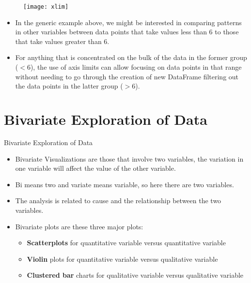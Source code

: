 \documentclass[12pt]{beamer}
\begin{document}
    \begin{frame}{}
    	\begin{figure}
    		\centering
    		\texttt{[image: xlim]}
    	\end{figure}
    	\begin{itemize}
    		\item In the generic example above, we might be interested in comparing patterns in other variables between data points that take values less than 6 to those that take values greater than 6.
    		\item For anything that is concentrated on the bulk of the data in the former group ($<6$), the use of axis limits can allow focusing on data points in that range without needing to go through the creation of new DataFrame filtering out the data points in the latter group ($>6$).
    	\end{itemize}
    \end{frame}
    \section{Bivariate Exploration of Data}
    \begin{frame}{Bivariate Exploration of Data}
    	\begin{itemize}
    		\item Bivariate Visualizations are those that involve two variables, the variation in one variable will affect the value of the other variable.
    		\item Bi means two and variate means variable, so here there are two variables. 
    		\item The analysis is related to cause and the relationship between the two variables.
    		\item Bivariate plots are these three major plots:
    		\begin{itemize}
    			\item \textbf{Scatterplots} for quantitative variable versus quantitative variable
    			\item \textbf{Violin} plots for quantitative variable versus qualitative variable
    			\item \textbf{Clustered bar} charts for qualitative variable versus qualitative variable
    		\end{itemize}
    	\end{itemize}
    \end{frame}
\end{document}
